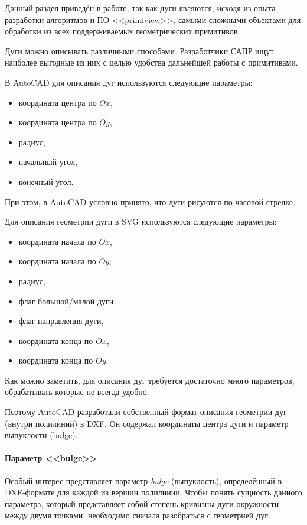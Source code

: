 Данный раздел приведён в работе, так как дуги являются, исходя из опыта разработки алгоритмов и ПО <<primiview>>, самыми сложными объектами для обработки из всех поддерживаемых геометрических примитивов.

Дуги можно описывать различными способами. Разработчики САПР ищут наиболее выгодные из них с целью удобства дальнейшей работы с примитивами.

В AutoCAD для описания дуг используются следующие параметры:
\begin{itemize}
	\item координата центра по $Ox$,
	\item координата центра по $Oy$,
	\item радиус,
	\item начальный угол,
	\item конечный угол.
\end{itemize}

При этом, в AutoCAD условно принято, что дуги рисуются по часовой стрелке.

Для описания геометрии дуги в SVG используются следующие параметры:
\begin{itemize}
	\item координата начала по $Ox$,
	\item координата начала по $Oy$,
	\item радиус,
	\item флаг большой/малой дуги,
	\item флаг направления дуги,
	\item координата конца по $Ox$,
	\item координата конца по $Oy$.
\end{itemize}

Как можно заметить, для описания дуг требуется достаточно много параметров, обрабатывать которые не всегда удобно.

Поэтому AutoCAD разработали собственный формат описания геометрии дуг (внутри полилиний) в DXF. Он содержал координаты центра дуги и параметр выпуклости (bulge).

\paragraph{Параметр <<bulge>>} \label{sec:bulge}

Особый интерес представляет параметр \textit{bulge} (выпуклость), определённый в DXF-формате для каждой из вершин полилинии.
Чтобы понять сущность данного параметра, который представляет собой степень кривизны дуги окружности между двумя точками, необходимо сначала разобраться с геометрией дуг.

